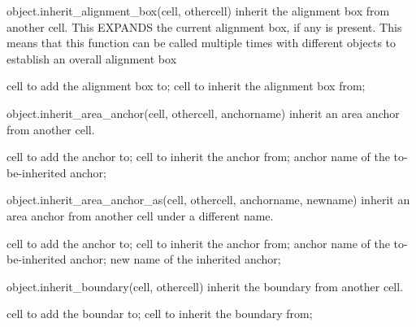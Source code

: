 \begin{APIfunc}{object.inherit\_alignment\_box(cell, othercell)}
    inherit the alignment box from another cell. This EXPANDS the current alignment box, if any is present. This means that this function can be called multiple times with different objects to establish an overall alignment box
    \begin{APIparameters}
            cell to add the alignment box to;
            cell to inherit the alignment box from;
    \end{APIparameters}
\end{APIfunc}
\begin{APIfunc}{object.inherit\_area\_anchor(cell, othercell, anchorname)}
    inherit an area anchor from another cell.
    \begin{APIparameters}
            cell to add the anchor to;
            cell to inherit the anchor from;
            anchor name of the to-be-inherited anchor;
    \end{APIparameters}
\end{APIfunc}
\begin{APIfunc}{object.inherit\_area\_anchor\_as(cell, othercell, anchorname, newname)}
    inherit an area anchor from another cell under a different name.
    \begin{APIparameters}
            cell to add the anchor to;
            cell to inherit the anchor from;
            anchor name of the to-be-inherited anchor;
            new name of the inherited anchor;
    \end{APIparameters}
\end{APIfunc}
\begin{APIfunc}{object.inherit\_boundary(cell, othercell)}
    inherit the boundary from another cell.
    \begin{APIparameters}
            cell to add the boundar to;
            cell to inherit the boundary from;
    \end{APIparameters}
\end{APIfunc}

